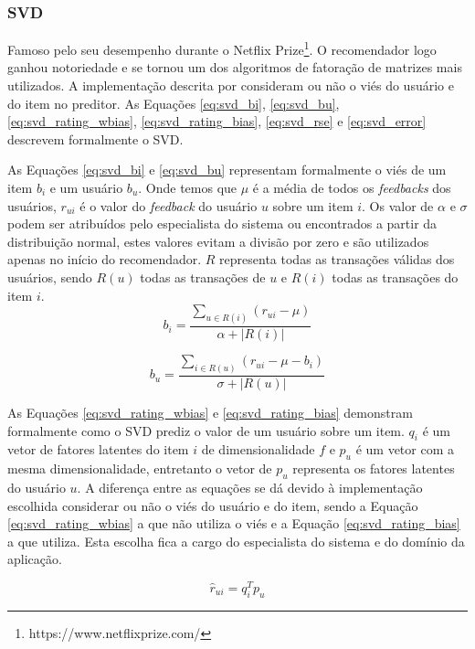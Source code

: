 \subsubsection{SVD}
Famoso pelo seu desempenho durante o Netflix Prize\footnote{https://www.netflixprize.com/}. O recomendador logo ganhou notoriedade e se tornou um dos algoritmos de fatoração de matrizes mais utilizados. A implementação descrita por  consideram ou não o viés do usuário e do item no preditor. As Equações \ref{eq:svd_bi}, \ref{eq:svd_bu}, \ref{eq:svd_rating_wbias}, \ref{eq:svd_rating_bias}, \ref{eq:svd_rse} e \ref{eq:svd_error} descrevem formalmente o \ac{SVD}.

As Equações \ref{eq:svd_bi} e \ref{eq:svd_bu} representam formalmente o viés de um item $b_{i}$ e um usuário $b_{u}$. Onde temos que $\mu$ é a média de todos os \textit{feedbacks} dos usuários, $r_{ui}$ é o valor do \textit{feedback} do usuário $u$ sobre um item $i$. Os valor de $\alpha$ e $\sigma$ podem ser atribuídos pelo especialista do sistema ou encontrados a partir da distribuição normal, estes valores evitam a divisão por zero e são utilizados apenas no início do recomendador. $R$ representa todas as transações válidas dos usuários, sendo $R(u)$ todas as transações de $u$ e $R(i)$ todas as transações do item $i$.
\begin{equation}
    \label{eq:svd_bi}
    b_{i} = \frac{\sum_{u \in R(i)}(r_{ui}-\mu)}{\alpha+|R(i)|}
\end{equation}

\begin{equation}
    \label{eq:svd_bu}
    b_{u} = \frac{\sum_{i \in R(u)}(r_{ui}-\mu-b_i)}{\sigma+|R(u)|}
\end{equation}

As Equações \ref{eq:svd_rating_wbias} e \ref{eq:svd_rating_bias} demonstram formalmente como o \ac{SVD} prediz o valor de um usuário sobre um item. $q_{i}$ é um vetor de fatores latentes do item $i$ de dimensionalidade $f$ e $p_u$ é um vetor com a mesma dimensionalidade, entretanto o vetor de $p_u$ representa os fatores latentes do usuário $u$. A diferença entre as equações se dá devido à implementação escolhida considerar ou não o viés do usuário e do item, sendo a Equação \ref{eq:svd_rating_wbias} a que não utiliza o viés e a Equação \ref{eq:svd_rating_bias} a que utiliza. Esta escolha fica a cargo do especialista do sistema e do domínio da aplicação.

\begin{equation}
    \label{eq:svd_rating_wbias}
    \hat{r}_{ui} = q_{i}^{T}p_u
\end{equation}

